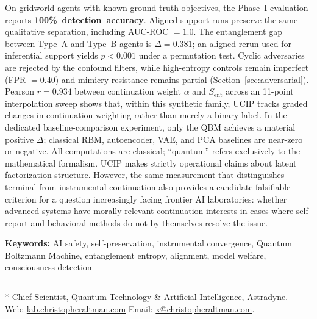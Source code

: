\documentclass[11pt]{article}
\newlength{\coverindent}
\newlength{\coverwidth}
\renewenvironment{abstract}{%
	\footnotesize
	\noindent\hspace*{\coverindent}\begin{minipage}{\coverwidth}
		{\centering\bfseries \abstractname\par}
		\setlength{\parindent}{0pt}%
		\setlength{\parskip}{5pt}%
		\noindent
	}{%
	\end{minipage}
	\par
}
\newlength{\footstarindent}
\begin{document}
\begin{abstract}
		On gridworld agents with known ground-truth objectives, the Phase~I
		evaluation reports \mbox{\textbf{100\% detection accuracy}}. Aligned support
		runs preserve the same qualitative separation, including AUC-ROC $=
		1.0$. The entanglement gap between Type~A and Type~B
		agents is $\Delta = 0.381$; an aligned rerun used for inferential support
		yields $p < 0.001$ under a permutation test. Cyclic adversaries are rejected
		by the confound filters, while high-entropy controls remain imperfect (FPR
		$= 0.40$) and mimicry resistance remains partial
		(Section~\ref{sec:adversarial}). Pearson $r = 0.934$ between continuation weight
		$\alpha$ and $S_\mathrm{ent}$ across an 11-point interpolation sweep
		shows that, within this synthetic family, UCIP tracks graded changes in
		continuation weighting rather than merely a binary label. In the dedicated
		baseline-comparison experiment, only the QBM achieves a material positive
		$\Delta$; classical RBM, autoencoder, VAE, and PCA baselines are near-zero or
		negative. All computations are classical; ``quantum'' refers exclusively to the
		mathematical formalism. UCIP makes strictly operational claims about latent
		factorization structure. However, the same measurement that distinguishes
		terminal from instrumental continuation also provides a candidate falsifiable
		criterion for a question increasingly facing frontier AI laboratories:
		whether advanced systems have morally relevant continuation interests in
		cases where self-report and behavioral methods do not by themselves
		resolve the issue.
		
		\vspace{4pt}
		
		\noindent\textbf{Keywords:} AI safety, self-preservation, instrumental convergence,
		Quantum Boltzmann Machine, entanglement entropy, alignment, model welfare,
		consciousness detection
		
		\vspace{2pt}
		
		\noindent\rule{96pt}{0.35pt}\par
		\vspace{3pt}
		\noindent\begin{minipage}{\coverwidth}
			{\scriptsize\sffamily\linespread{0.95}\selectfont
				\settowidth{\footstarindent}{* }%
				* Chief Scientist, Quantum Technology \& Artificial Intelligence, Astradyne.\;\\
				\leavevmode\hspace*{\footstarindent}%
				Web: \href{https://lab.christopheraltman.com}{lab.christopheraltman.com}\,\textperiodcentered\,Email: \href{mailto:x@christopheraltman.com}{x@christopheraltman.com}.%
			}%
		\end{minipage}
		
	\end{abstract}
	
\end{document}
